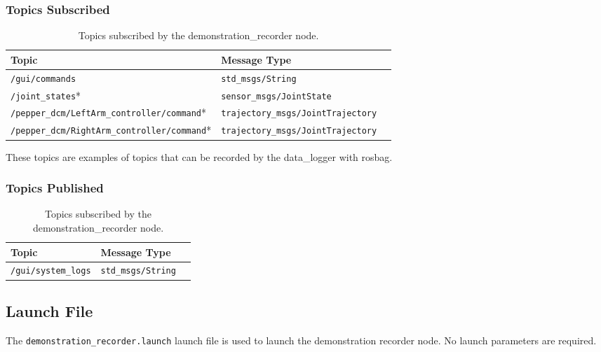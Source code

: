 \documentclass{CSSRforAfrica}
\begin{document}
\newpage
\subsubsection*{Topics Subscribed}
\begin{longtable}[c]{|l|l|l|}
    \caption{Topics subscribed by the demonstration\_recorder node.} \label{tab:Published_topics} \\
    \hline
    \rowcolor{gray!30}
    \footnotesize{\textbf{Topic}} & \footnotesize{\textbf{Message Type}} \\ \hline
    \endhead %
    
    \footnotesize{\texttt{/gui/commands}} & \footnotesize{\texttt{std\_msgs/String}} \\ \hline
    \footnotesize{\texttt{/joint\_states}*} & \footnotesize{\texttt{sensor\_msgs/JointState}} \\ \hline
    \footnotesize{\texttt{/pepper\_dcm/LeftArm\_controller/command}*} & \footnotesize{\texttt{trajectory\_msgs/JointTrajectory}} \\ \hline
    \footnotesize{\texttt{/pepper\_dcm/RightArm\_controller/command}*} & \footnotesize{\texttt{trajectory\_msgs/JointTrajectory}} \\ \hline

\end{longtable}
{\footnotesize *These topics are examples of topics that can be recorded by the data\_logger with rosbag.}

\subsubsection*{Topics Published}

\begin{longtable}[c]{|l|l|l|}
    \caption{Topics subscribed by the demonstration\_recorder node.} \label{tab:Published_topics} \\
    \hline
    \rowcolor{gray!30}
    \footnotesize{\textbf{Topic}} & \footnotesize{\textbf{Message Type}} \\ \hline
    \endhead %
    \footnotesize{\texttt{/gui/system\_logs}} & \footnotesize{\texttt{std\_msgs/String}} \\ \hline
\end{longtable}

\subsection*{Launch File}
The \texttt{demonstration\_recorder.launch} launch file is used to launch the demonstration recorder node. No launch parameters are required. 
\end{document}
